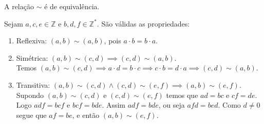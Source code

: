 \documentclass[../main.tex]{subfiles}
\begin{document}
\begin{teo}
    A relação $\sim$ é de equivalência.
\end{teo}
\begin{dem}
    Sejam $a,c,e \in \mathbb{Z}$ e $b,d,f \in \mathbb{Z}^*$. São válidas as propriedades:
    \begin{enumerate}[label=(\roman*)]
        \item Reflexiva: $\left( a,b \right) \sim \left( a,b \right)$, pois $a  \cdot b=b  \cdot a$.
        \item Simétrica: $ \left( a ,b \right) \sim \left( c,d \right) \implies \left( c,d \right) \sim \left( a,b \right) $. \\
        Temos $  (a,b) \sim (c,d) \implies a  \cdot d = b  \cdot c \implies c  \cdot b = d  \cdot a \implies \left( c,d \right) \sim \left( a,b \right) $.

        \item Transitiva: $ \left( a,b \right) \sim \left( c,d \right) \land \left( c,d \right) \sim \left( e,f \right) \implies \left( a,b \right) \sim \left( e,f \right)$. \\
        Supondo $(a,b) \sim (c,d)$ e $(c,d) \sim (e,f)$ temos que $ad=bc$ e $cf = de$. Logo $adf = bcf$ e $bcf = bde$. Assim $adf=bde$, ou seja $afd=bed$. Como $d \neq 0$ segue que $af=be$, e então $(a,b) \sim (e,f)$.
        
    \end{enumerate}
\end{dem}
\end{document}
